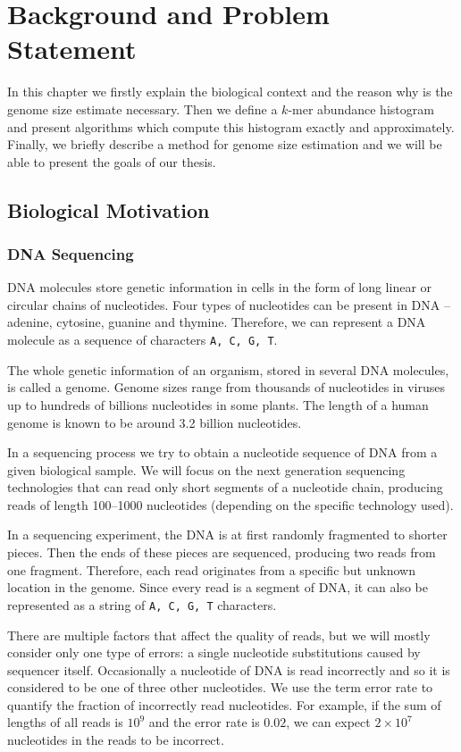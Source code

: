 \chapter{Background and Problem Statement}
In this chapter we firstly explain the biological context and the reason why is 
the genome size estimate necessary. Then we define a $k$-mer abundance histogram
and present algorithms which compute this histogram exactly and approximately.
Finally, we briefly describe a method for genome size estimation and we will be
able to present the goals of our thesis.

\section{Biological Motivation}

\subsection{DNA Sequencing}
\label{sec:sequencing}

DNA molecules store genetic information in cells in the form of long linear or circular chains
of nucleotides. Four types of nucleotides can be present in DNA -- adenine, cytosine, guanine
and thymine. Therefore, we can represent a DNA molecule as a sequence of characters
\texttt{A, C, G, T}.

The whole genetic information of an organism, stored in several DNA molecules, is called a genome.
Genome sizes range from thousands of nucleotides in viruses up to hundreds of billions
nucleotides in some plants. The length of a human genome is known to be around
3.2 billion nucleotides.

In a sequencing process we try to obtain a nucleotide sequence of DNA from
a given biological sample. We will focus on the next generation sequencing technologies
that can read only short segments of a nucleotide chain, producing reads of length 100--1000
nucleotides (depending on the specific technology used).

In a sequencing experiment, the DNA is at first randomly fragmented to shorter pieces.
Then the ends of these pieces are sequenced, producing two reads from one fragment. 
Therefore, each read originates from a specific but unknown location in the genome. 
Since every read is a segment of DNA, it can also be represented as a string of
\texttt{A, C, G, T} characters.

There are multiple factors that affect the quality of reads, but we will mostly consider only
one type of errors: a single nucleotide substitutions caused by sequencer itself. Occasionally
a nucleotide of DNA is read incorrectly and so it is considered to be one of three
other nucleotides. We use the term error rate to quantify the fraction of incorrectly
read nucleotides. For example, if the sum of lengths of all reads is $10^9$ and the error
rate is $0.02$, we can expect $2 \times 10^7$ nucleotides in the reads to be incorrect.

